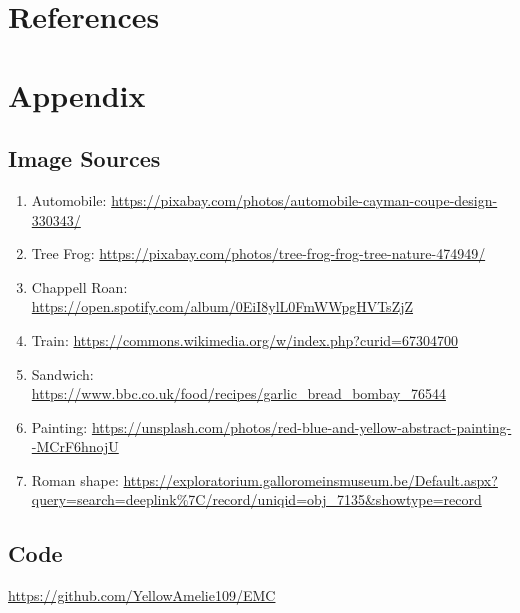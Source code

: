 \documentclass{article}
\begin{document}
\section{References}
\printbibliography[heading=none]

\section{Appendix}
\subsection{Image Sources}\label{Sources}
\begin{enumerate}
    \item Automobile: \url{https://pixabay.com/photos/automobile-cayman-coupe-design-330343/}
    \item Tree Frog: \url{https://pixabay.com/photos/tree-frog-frog-tree-nature-474949/}
    \item Chappell Roan: \url{https://open.spotify.com/album/0EiI8ylL0FmWWpgHVTsZjZ}
    \item Train: \url{https://commons.wikimedia.org/w/index.php?curid=67304700}
    \item Sandwich: \url{https://www.bbc.co.uk/food/recipes/garlic_bread_bombay_76544}
    \item Painting: \url{https://unsplash.com/photos/red-blue-and-yellow-abstract-painting--MCrF6hnojU}
    \item Roman shape: \url{https://exploratorium.galloromeinsmuseum.be/Default.aspx?query=search=deeplink%7C/record/uniqid=obj_7135&showtype=record}
\end{enumerate}

\subsection{Code}
\url{https://github.com/YellowAmelie109/EMC}
\end{document}
